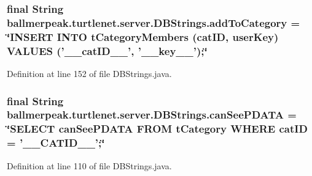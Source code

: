 \hypertarget{classballmerpeak_1_1turtlenet_1_1server_1_1DBStrings_ae9cfc6daa2238b984d82b11442b47a49}{
\subsubsection[{add\-To\-Category}]{\setlength{\rightskip}{0pt plus 5cm}final String ballmerpeak.\-turtlenet.\-server.\-D\-B\-Strings.\-add\-To\-Category = \char`\"{}I\-N\-S\-E\-R\-T I\-N\-T\-O t\-Category\-Members (cat\-I\-D, user\-Key) V\-A\-L\-U\-E\-S ('\-\_\-\-\_\-cat\-I\-D\-\_\-\-\_\-', '\-\_\-\-\_\-key\-\_\-\-\_\-');\char`\"{}\hspace{0.3cm}{\ttfamily [static]}}}\label{classballmerpeak_1_1turtlenet_1_1server_1_1DBStrings_ae9cfc6daa2238b984d82b11442b47a49}


Definition at line 152 of file D\-B\-Strings.\-java.

\hypertarget{classballmerpeak_1_1turtlenet_1_1server_1_1DBStrings_a77d2491681df92cdf133252afe8af98d}{
\subsubsection[{can\-See\-P\-D\-A\-T\-A}]{\setlength{\rightskip}{0pt plus 5cm}final String ballmerpeak.\-turtlenet.\-server.\-D\-B\-Strings.\-can\-See\-P\-D\-A\-T\-A = \char`\"{}S\-E\-L\-E\-C\-T can\-See\-P\-D\-A\-T\-A F\-R\-O\-M t\-Category W\-H\-E\-R\-E cat\-I\-D = '\-\_\-\-\_\-\-C\-A\-T\-I\-D\-\_\-\-\_\-';\char`\"{}\hspace{0.3cm}{\ttfamily [static]}}}\label{classballmerpeak_1_1turtlenet_1_1server_1_1DBStrings_a77d2491681df92cdf133252afe8af98d}


Definition at line 110 of file D\-B\-Strings.\-java.


